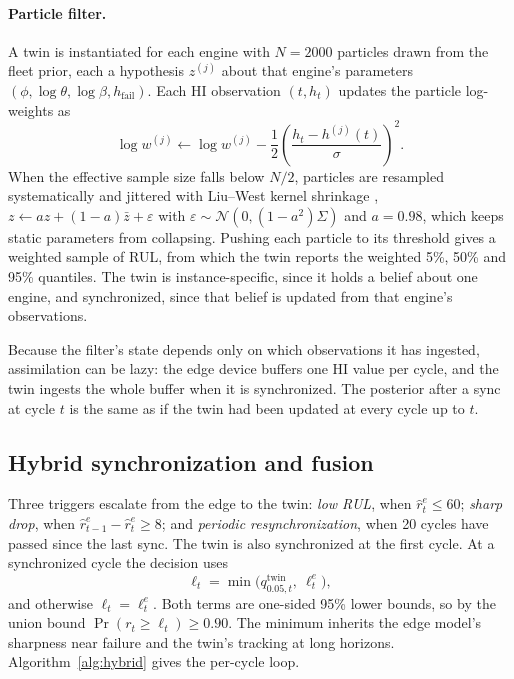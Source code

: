\documentclass[preprint,12pt,authoryear]{elsarticle}
\begin{document}
\paragraph{Particle filter.} A twin is instantiated for each engine with $N = 2000$ particles drawn from the fleet prior, each a hypothesis $z^{(j)}$ about that engine's parameters $(\phi, \log\theta, \log\beta, h_{\mathrm{fail}})$. Each HI observation $(t, h_t)$ updates the particle log-weights as
\begin{equation}
\log w^{(j)} \leftarrow \log w^{(j)} - \frac{1}{2}\left(\frac{h_t - h^{(j)}(t)}{\sigma}\right)^{2}.
\end{equation}
When the effective sample size falls below $N/2$, particles are resampled systematically and jittered with Liu--West kernel shrinkage \citep{liu2001combined}, $z \leftarrow a z + (1-a)\bar z + \varepsilon$ with $\varepsilon \sim \mathcal{N}(0, (1-a^2)\Sigma)$ and $a = 0.98$, which keeps static parameters from collapsing. Pushing each particle to its threshold gives a weighted sample of RUL, from which the twin reports the weighted 5\%, 50\% and 95\% quantiles. The twin is instance-specific, since it holds a belief about one engine, and synchronized, since that belief is updated from that engine's observations.

Because the filter's state depends only on which observations it has ingested, assimilation can be lazy: the edge device buffers one HI value per cycle, and the twin ingests the whole buffer when it is synchronized. The posterior after a sync at cycle $t$ is the same as if the twin had been updated at every cycle up to $t$.

\subsection{Hybrid synchronization and fusion}\label{sec:hybrid}
Three triggers escalate from the edge to the twin: \emph{low RUL}, when $\hat r^{e}_t \le 60$; \emph{sharp drop}, when $\hat r^{e}_{t-1} - \hat r^{e}_t \ge 8$; and \emph{periodic resynchronization}, when 20 cycles have passed since the last sync. The twin is also synchronized at the first cycle. At a synchronized cycle the decision uses
\begin{equation}
\ell_t = \min\big(q^{\mathrm{twin}}_{0.05,t},\ \ell^{e}_t\big),
\end{equation}
and otherwise $\ell_t = \ell^{e}_t$. Both terms are one-sided 95\% lower bounds, so by the union bound $\Pr(r_t \ge \ell_t) \ge 0.90$. The minimum inherits the edge model's sharpness near failure and the twin's tracking at long horizons. Algorithm~\ref{alg:hybrid} gives the per-cycle loop.
\end{document}
